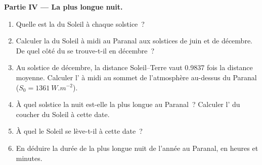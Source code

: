 \begin{problem}
\medskip
\noindent\textbf{Partie IV --- La plus longue nuit.}
\begin{enumerate}[resume]
  \item Quelle est la  du Soleil à chaque solstice~?
  \item Calculer la  du Soleil à midi au Paranal aux solstices de juin et
        de décembre. De quel côté du  se trouve-t-il en décembre~?
  \item Au solstice de décembre, la distance Soleil--Terre vaut 0.9837 fois la
        distance moyenne. Calculer l' à midi au sommet de
        l'atmosphère au-dessus du Paranal ($S_0 = \qty{1361}{W.m^{-2}}$).
  \item À quel solstice la nuit est-elle la plus longue au Paranal~? Calculer
        l' du coucher du Soleil à cette date.
  \item À quel  le Soleil se lève-t-il à cette date~?
  \item En déduire la durée de la plus longue nuit de l'année au Paranal, en
        heures et minutes.
\end{enumerate}
\end{problem}
